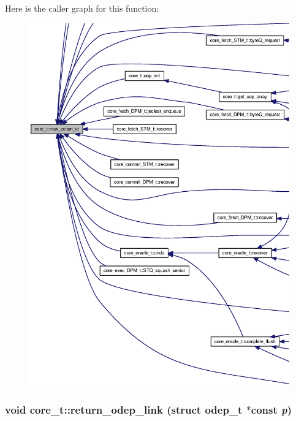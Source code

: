 Here is the caller graph for this function:\nopagebreak
\begin{figure}[H]
\begin{center}
\leavevmode
\includegraphics[width=420pt]{classcore__t_110f33d959a11c403fb9166326c7e5f3_icgraph}
\end{center}
\end{figure}
\subsubsection[{return\_\-odep\_\-link}]{\setlength{\rightskip}{0pt plus 5cm}void core\_\-t::return\_\-odep\_\-link (struct {\bf odep\_\-t} $\ast$const  {\em p})}\label{classcore__t_c76899d81828f8557930f9ab87f4938e}




